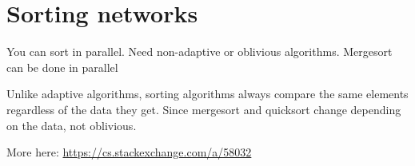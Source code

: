\section{Sorting networks}

You can sort in parallel. Need non-adaptive or oblivious algorithms. Mergesort can be done in parallel

Unlike adaptive algorithms,  sorting algorithms always compare the same elements regardless of the data they get. Since mergesort and quicksort change depending on the data, not oblivious.

More here: \url{https://cs.stackexchange.com/a/58032}
